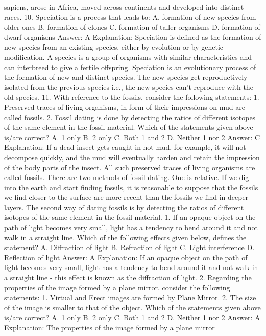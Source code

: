 sapiens, arose in Africa, moved across continents and developed into
distinct races.
10. Speciation is a process that leads to:
A. formation of new species from older ones
B. formation of clones
C. formation of taller organisms
D. formation of dwarf organisms
Answer: A
Explanation: Speciation is defined as the formation of new species
from an existing species, either by evolution or by genetic
modification.
A species is a group of organisms with similar characteristics and
can interbreed to give a fertile offspring. Speciation is an
evolutionary process of the formation of new and distinct species.
The new species get reproductively isolated from the previous
species i.e., the new species can’t reproduce with the old species.
11. With reference to the fossils, consider the following
statements:
1. Preserved traces of living organisms, in form of their impressions
on mud are called fossils.
2. Fossil dating is done by detecting the ratios of different isotopes
of the same element in the fossil material.
Which of the statements given above is/are correct?
A. 1 only
B. 2 only
C. Both 1 and 2
D. Neither 1 nor 2
Answer: C
Explanation: If a dead insect gets caught in hot mud, for example,
it will not decompose quickly, and the mud will eventually harden and
retain the impression of the body parts of the insect. All such
preserved traces of living organisms are called fossils.
There are two methods of fossil dating. One is relative. If we dig
into the earth and start finding fossils, it is reasonable to suppose
that the fossils we find closer to the surface are more recent than
the fossils we find in deeper layers. The second way of dating fossils
is by detecting the ratios of different isotopes of the same element
in the fossil material.
1. If an opaque object on the path of light becomes very small,
light has a tendency to bend around it and not walk in a straight
line. Which of the following effects given below, defines the
statement?
A. Diffraction of light
B. Refraction of light
C. Light interference
D. Reflection of light
Answer: A
Explanation: If an opaque object on the path of light becomes very
small, light has a tendency to bend around it and not walk in a
straight line - this effect is known as the diffraction of light.
2. Regarding the properties of the image formed by a plane
mirror, consider the following statements:
1. Virtual and Erect images are formed by Plane Mirror.
2. The size of the image is smaller to that of the object.
Which of the statements given above is/are correct?
A. 1 only
B. 2 only
C. Both 1 and 2
D. Neither 1 nor 2
Answer: A
Explanation: The properties of the image formed by a plane mirror

